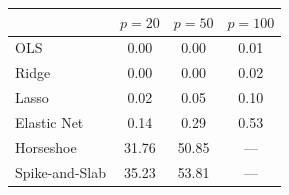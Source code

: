 \begin{tabular}{lccc}
\toprule
 & $p=20$ & $p=50$ & $p=100$ \\
\midrule
OLS & 0.00 & 0.00 & 0.01 \\
Ridge & 0.00 & 0.00 & 0.02 \\
Lasso & 0.02 & 0.05 & 0.10 \\
Elastic Net & 0.14 & 0.29 & 0.53 \\
Horseshoe & 31.76 & 50.85 & --- \\
Spike-and-Slab & 35.23 & 53.81 & --- \\
\bottomrule
\end{tabular}
